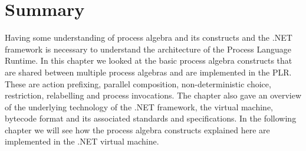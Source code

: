 \section{Summary}
	Having some understanding of process algebra and its constructs and the .NET 
	framework is necessary to understand the architecture of the Process 
	Language Runtime. In this chapter we looked at the basic process algebra 
	constructs that are shared between multiple process algebras and are 
	implemented in the PLR. These are action prefixing, parallel composition, 
	non-deterministic choice, restriction, relabelling and process invocations.
	The chapter also gave an overview of the underlying technology of the .NET 
	framework, the virtual machine, bytecode format and its associated standards 
	and specifications. In the following chapter we will see how the process 
	algebra constructs explained here are implemented in the .NET virtual 
	machine.
